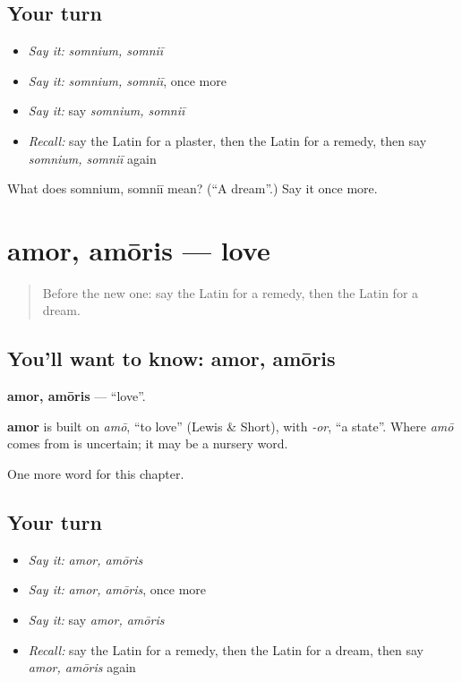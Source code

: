 \subsection*{Your turn}
\begin{itemize}
\raggedright
  \item \emph{Say it:} \emph{somnium, somniī}
  \item \emph{Say it:} \emph{somnium, somniī}, once more
  \item \emph{Say it:} say \emph{somnium, somniī}
  \item \emph{Recall:} say the Latin for a plaster, then the Latin for a remedy, then say \emph{somnium, somniī} again
\end{itemize}

\begin{tcolorbox}[breakable,colback=teal!4,colframe=teal!35!black,title={Before you move on}]
What does somnium, somniī mean? (\textquotedblleft{}A dream\textquotedblright{}.) Say it once more.
\end{tcolorbox}
\section[amor, amōris]{amor, amōris — love}

\label{lesson:LA-C236-amor}



\begin{quote}
Before the new one: say the Latin for a remedy, then the Latin for a dream.
\end{quote}

\subsection*{You'll want to know: amor, amōris}
\textbf{amor, amōris} — \textquotedblleft{}love\textquotedblright{}.

\begin{cousinweb}
\textbf{amor} is built on \emph{amō}, \textquotedblleft{}to love\textquotedblright{} (Lewis \& Short), with \emph{-or}, \textquotedblleft{}a state\textquotedblright{}. Where \emph{amō} comes from is uncertain; it may be a nursery word.
\end{cousinweb}

\begin{grammarlens}[title={What you've built}]
One more word for this chapter.
\end{grammarlens}

\subsection*{Your turn}
\begin{itemize}
\raggedright
  \item \emph{Say it:} \emph{amor, amōris}
  \item \emph{Say it:} \emph{amor, amōris}, once more
  \item \emph{Say it:} say \emph{amor, amōris}
  \item \emph{Recall:} say the Latin for a remedy, then the Latin for a dream, then say \emph{amor, amōris} again
\end{itemize}

